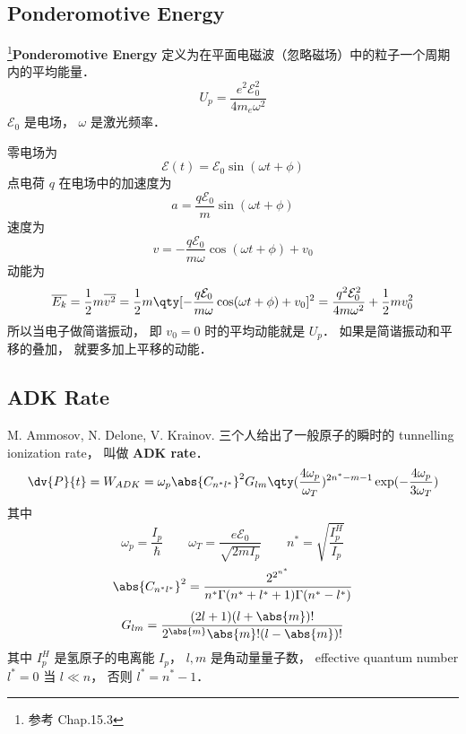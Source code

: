 
\begin{issues}
\end{issues}

\subsection{Ponderomotive Energy}
\footnote{参考 \cite{Brandsen} Chap.15.3}\textbf{Ponderomotive Energy} 定义为在平面电磁波（忽略磁场）中的粒子一个周期内的平均能量．
\begin{equation}
U_p = \frac{e^2 \mathcal E_0^2}{4m_e\omega^2}
\end{equation}
$\mathcal E_0$ 是电场， $\omega$ 是激光频率．

零电场为
\begin{equation}
\mathcal E(t) = \mathcal E_0 \sin(\omega t + \phi)
\end{equation}
点电荷 $q$ 在电场中的加速度为
\begin{equation}
a = \frac{q\mathcal E_0}{m} \sin(\omega t + \phi)
\end{equation}
速度为
\begin{equation}
v = -\frac{q\mathcal E_0}{m\omega} \cos(\omega t + \phi) + v_0
\end{equation}
动能为
\begin{equation}
\overline{E_k} = \frac{1}{2}m \overline{v^2} = \frac{1}{2}m \qty[-\frac{q\mathcal E_0}{m\omega} \cos(\omega t + \phi) + v_0]^2 = \frac{q^2\mathcal E_0^2}{4m\omega^2} + \frac{1}{2}mv_0^2
\end{equation}
所以当电子做简谐振动， 即 $v_0 = 0$ 时的平均动能就是 $U_p$． 如果是简谐振动和平移的叠加， 就要多加上平移的动能．

\subsection{ADK Rate}
M. Ammosov, N. Delone, V. Krainov. 三个人给出了一般原子的瞬时的 tunnelling ionization rate， 叫做 \textbf{ADK rate}．
\begin{equation}
\dv{P}{t} = W_{ADK} = \omega_p \abs{C_{n^*l^*}}^2 G_{lm}\qty(\frac{4\omega_p}{\omega_T})^{2n^*-m-1}\exp(-\frac{4\omega_p}{3\omega_T})
\end{equation}
其中
\begin{equation}
\omega_p = \frac{I_p}{\hbar} \qquad \omega_T = \frac{e\mathcal E_0}{\sqrt{2mI_p}} \qquad
n^* = \sqrt{\frac{I_p^H}{I_p}}
\end{equation}
\begin{equation}
\abs{C_{n^*l^*}}^2 = \frac{2^{2^{n^*}}}{n^* \Gamma(n^* + l^* + 1) \Gamma(n^* - l^*)}
\end{equation}
\begin{equation}
G_{lm} = \frac{(2l+1)(l+\abs{m})!}{2^{\abs{m}}\abs{m}!(l-\abs{m})!}
\end{equation}
其中 $I_p^H$ 是氢原子的电离能 $I_p$， $l,m$ 是角动量量子数， effective quantum number $l^* = 0$ 当 $l\ll n$， 否则 $l^* = n^*-1$．

